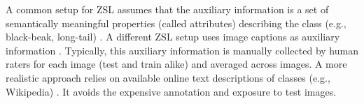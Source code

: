\documentclass[11pt,a4paper]{article}
\newcommand\gal[1]{\textcolor{bright}{\textbf{GAL:} #1 }}
\newcommand\tzuf[1]{\textcolor{blue}{\textbf{TZUF:} #1 }}
\begin{document}
\vspace{-0.2in}



A common setup for ZSL assumes that the auxiliary information is a set of semantically meaningful properties (called attributes) describing the class (e.g., black-beak, long-tail) \citep{wah2011caltech,farhadi2009describing}. A different ZSL setup uses image captions as auxiliary information \citep{reed2016learning,Felix_2018_ECCV}. Typically, this auxiliary information is manually collected by human raters for each image (test and train alike) and averaged across images.
A more realistic approach 
relies on available online text descriptions of classes (e.g., Wikipedia) \cite{elhoseiny2017link}. It avoids the expensive annotation and exposure to test images.

\end{document}
